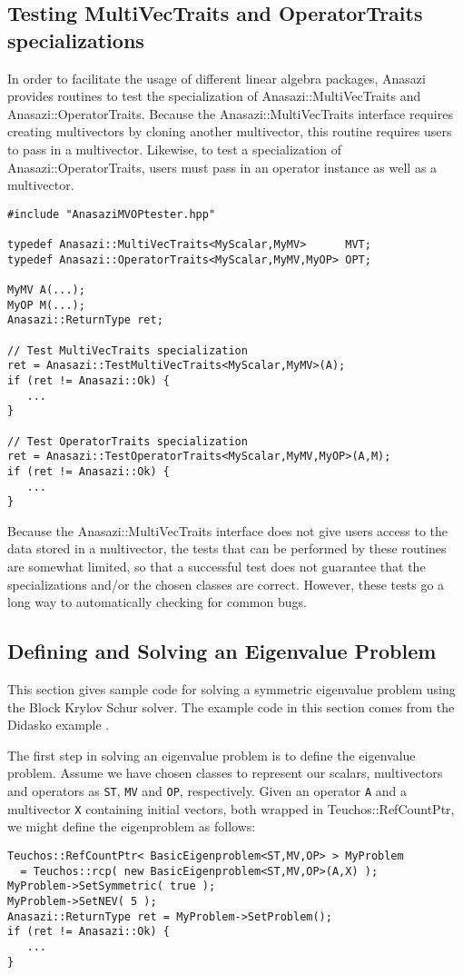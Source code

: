 \subsection{Testing MultiVecTraits and OperatorTraits specializations}
\label{sec:anasazi:MVOPtester}

In order to facilitate the usage of different linear algebra packages, Anasazi
provides routines to test the specialization of Anasazi::MultiVecTraits and
Anasazi::OperatorTraits. Because the Anasazi::MultiVecTraits interface requires
creating multivectors by cloning another multivector, this routine requires 
users to pass in a multivector. Likewise, to test a specialization of
Anasazi::OperatorTraits, users must pass in an operator instance as well as a
multivector.
\begin{verbatim}
#include "AnasaziMVOPtester.hpp"

typedef Anasazi::MultiVecTraits<MyScalar,MyMV>      MVT;
typedef Anasazi::OperatorTraits<MyScalar,MyMV,MyOP> OPT;

MyMV A(...);
MyOP M(...);
Anasazi::ReturnType ret;

// Test MultiVecTraits specialization
ret = Anasazi::TestMultiVecTraits<MyScalar,MyMV>(A);
if (ret != Anasazi::Ok) {
   ...
}

// Test OperatorTraits specialization
ret = Anasazi::TestOperatorTraits<MyScalar,MyMV,MyOP>(A,M);
if (ret != Anasazi::Ok) {
   ...
}
\end{verbatim}

Because the Anasazi::MultiVecTraits interface does not give users access to the
data stored in a multivector, the tests that can be performed by these routines
are somewhat limited, so that a successful test does not guarantee that the
specializations and/or the chosen classes are correct. However, these tests go a
long way to automatically checking for common bugs.

\subsection{Defining and Solving an Eigenvalue Problem}
\label{sec:anasazi:example}

This section gives sample code for solving a symmetric eigenvalue problem using
the Block Krylov Schur solver. The example code in this section comes from the
Didasko example .

The first step in solving an eigenvalue problem is to define the eigenvalue
problem. Assume we have chosen classes to represent our scalars, multivectors
and operators as \verb!ST!, \verb!MV! and \verb!OP!, respectively. Given an
operator \verb!A! and a multivector \verb!X! containing initial vectors, both
wrapped in Teuchos::RefCountPtr, we might define the eigenproblem as
follows:
\begin{verbatim}
Teuchos::RefCountPtr< BasicEigenproblem<ST,MV,OP> > MyProblem 
  = Teuchos::rcp( new BasicEigenproblem<ST,MV,OP>(A,X) );
MyProblem->SetSymmetric( true );
MyProblem->SetNEV( 5 );
Anasazi::ReturnType ret = MyProblem->SetProblem();
if (ret != Anasazi::Ok) {
   ...
}
\end{verbatim}

